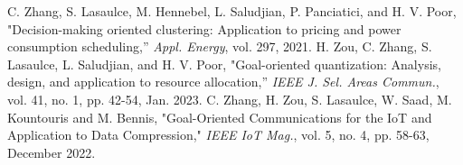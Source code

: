 \documentclass[francais]{gretsi}
\begin{document}
\begin{thebibliography}{10}
 C. Zhang, S. Lasaulce, M. Hennebel, L. Saludjian, P. Panciatici, and H. V. Poor, "Decision-making oriented clustering: Application to pricing
and power consumption scheduling,'' \textit{Appl. Energy}, vol. 297, 2021.
H. Zou, C. Zhang, S. Lasaulce, L. Saludjian, and H. V. Poor, "Goal-oriented quantization: Analysis, design, and application to resource allocation,'' \textit{IEEE J. Sel. Areas Commun.}, vol. 41, no. 1, pp. 42-54, Jan. 2023.
C. Zhang, H. Zou, S. Lasaulce, W. Saad, M. Kountouris and M. Bennis, "Goal-Oriented Communications for the IoT and Application to Data Compression," \textit{IEEE IoT Mag.}, vol. 5, no. 4, pp. 58-63, December 2022.
\end{thebibliography}

\end{document}
